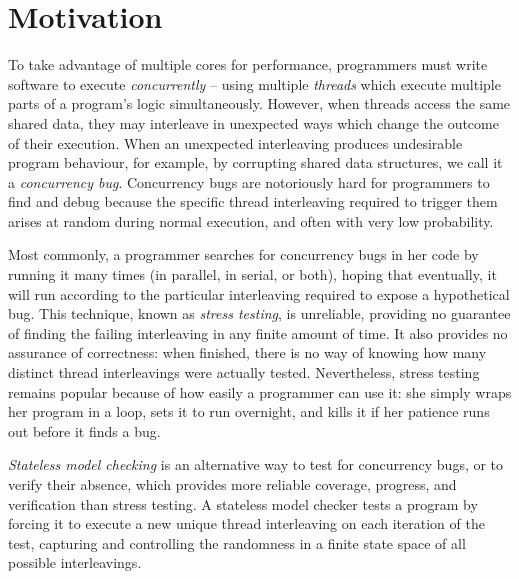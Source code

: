 \section{Motivation}

To take advantage of multiple cores for performance, programmers must write software to execute {\em concurrently} --
using multiple {\em threads} which execute multiple parts of a program's logic simultaneously.
However, when threads access the same shared data, they may interleave in unexpected ways which change the outcome of their execution.
When an unexpected interleaving produces undesirable program behaviour,
for example, by corrupting shared data structures,
we call it a {\em concurrency bug}.
Concurrency bugs are notoriously hard for programmers to find and debug
because the specific thread interleaving required to trigger them arises at random during normal execution,
and often with very low probability.

Most commonly, a programmer searches for concurrency bugs in her code by running it many times (in parallel, in serial, or both),
hoping that eventually, it will run according to the particular interleaving required to expose a hypothetical bug.
This technique, known as {\em stress testing}, is unreliable,
providing no guarantee of finding the failing interleaving in any finite amount of time.
It also provides no assurance of correctness:
when finished, there is no way of knowing how many distinct thread interleavings were actually tested.
Nevertheless, stress testing remains popular because of how easily a programmer can use it:
she simply wraps her program in a loop, sets it to run overnight, and kills it if her patience runs out before it finds a bug.

{\em Stateless model checking} \cite{verisoft} is an alternative way to test for concurrency bugs,
or to verify their absence,
which provides more reliable coverage, progress, and verification than stress testing.
A stateless model checker tests a program by forcing it to execute a new unique thread interleaving on each iteration of the test,
capturing and controlling the randomness in a finite state space of all possible interleavings.

